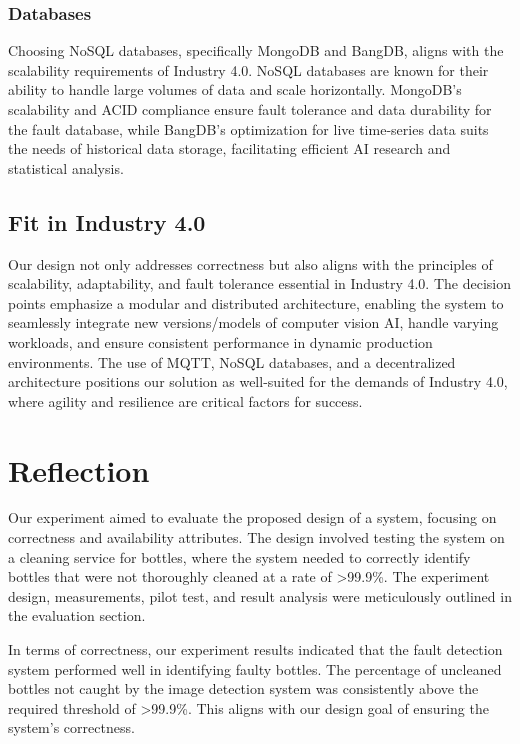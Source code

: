 \documentclass[conference]{IEEEtran}
\begin{document}
\subsubsection{Databases}
Choosing NoSQL databases, specifically MongoDB and BangDB, aligns with the scalability requirements of Industry 4.0. NoSQL databases are known for their ability to handle large volumes of data and scale horizontally. MongoDB's scalability and ACID compliance ensure fault tolerance and data durability for the fault database, while BangDB's optimization for live time-series data suits the needs of historical data storage, facilitating efficient AI research and statistical analysis.

\subsection{Fit in Industry 4.0}
Our design not only addresses correctness but also aligns with the principles of scalability, adaptability, and fault tolerance essential in Industry 4.0\cite{Kang2016-nq}. The decision points emphasize a modular and distributed architecture, enabling the system to seamlessly integrate new versions/models of computer vision AI, handle varying workloads, and ensure consistent performance in dynamic production environments. The use of MQTT, NoSQL databases, and a decentralized architecture positions our solution as well-suited for the demands of Industry 4.0, where agility and resilience are critical factors for success.

\section{Reflection}

Our experiment aimed to evaluate the proposed design of a system, focusing on correctness and availability attributes. The design involved testing the system on a cleaning service for bottles, where the system needed to correctly identify bottles that were not thoroughly cleaned at a rate of \textgreater99.9\%. The experiment design, measurements, pilot test, and result analysis were meticulously outlined in the evaluation section.

In terms of correctness, our experiment results indicated that the fault detection system performed well in identifying faulty bottles. The percentage of uncleaned bottles not caught by the image detection system was consistently above the required threshold of \textgreater99.9\%. This aligns with our design goal of ensuring the  system's correctness.
\end{document}
